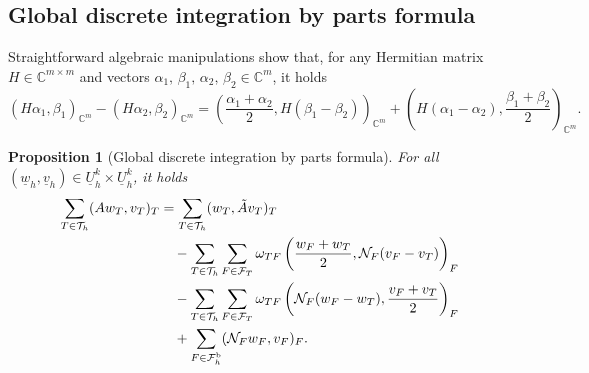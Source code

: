 \documentclass[11pt,a4paper]{article}
\theoremstyle{plain}
\newtheorem{proposition}[theorem]{Proposition}
\theoremstyle{remark}
\theoremstyle{definition}
\newcommand{\Complex}{\mathbb{C}}
\newcommand{\Th}{\mathcal{T}_h}
\newcommand{\Fhb}{\mathcal{F}_h^{\rm b}}
\newcommand{\FT}{\mathcal{F}_T}
\newcommand{\Uh}{\underline{U}_h^k}
\begin{document}
\subsection{Global discrete integration by parts formula}

Straightforward algebraic manipulations show that, for any Hermitian matrix $H \in \Complex^{m\times m}$ and vectors $\alpha_1,\,\beta_1,\,\alpha_2,\,\beta_2 \in \Complex^m$, it holds
\begin{equation}\label{eq:magic:algebraic}
  (H \alpha_1, \beta_1)_{\Complex^m} - (H \alpha_2, \beta_2)_{\Complex^m}
  = \left(\frac{\alpha_1 + \alpha_2}{2}, H(\beta_1 - \beta_2)\right)_{\Complex^m}
  + \left(H(\alpha_1 - \alpha_2), \frac{\beta_1 + \beta_2}{2}\right)_{\Complex^m}.
\end{equation}

\begin{proposition}[Global discrete integration by parts formula]\label{prop:ibp:global}
  For all $(\underline{w}_h, \underline{v}_h) \in \Uh \times \Uh$, it holds
  \begin{equation}\label{eq:ibp:global}
    \begin{aligned}
      \sum_{T \in \Th} (A w_T, v_T)_T
      &= \sum_{T \in \Th} (w_T, \tilde{A} v_T)_T
      \\
      &\quad
      - \sum_{T \in \Th} \sum_{F \in \FT} \omega_{TF} \left(\frac{w_F + w_T}{2}, \mathcal{N}_F (v_F - v_T)\right)_F
      \\
      &\quad
      - \sum_{T \in \Th} \sum_{F \in \FT} \omega_{TF}  \left(\mathcal{N}_F(w_F - w_T), \frac{v_F + v_T}{2}\right)_F
      \\
      &\quad
      + \sum_{F \in \Fhb} (\mathcal{N}_F w_F, v_F)_F.
    \end{aligned}
  \end{equation}
\end{proposition}
\end{document}

